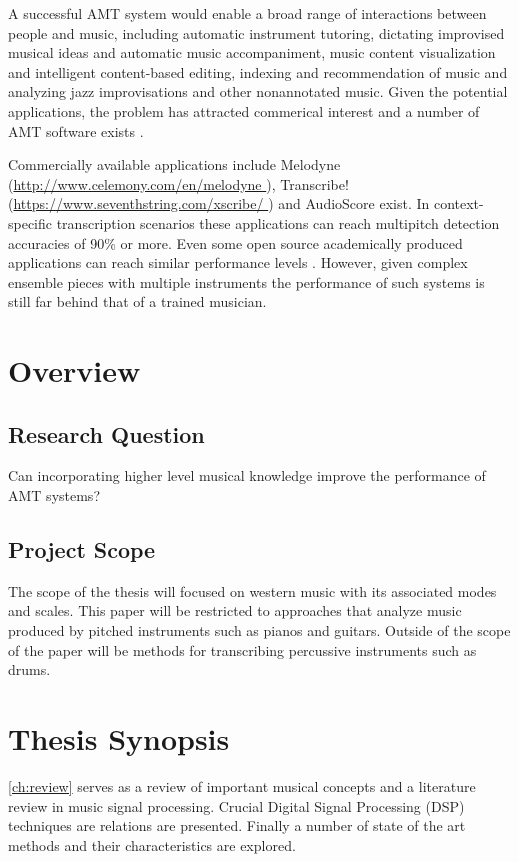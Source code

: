 A successful \ac{AMT} system would enable a broad range of interactions between
people and music, including automatic instrument tutoring, dictating improvised
musical ideas and automatic music accompaniment, music content visualization and
intelligent content-based editing, indexing and recommendation of music and
analyzing jazz improvisations and other nonannotated music. Given the potential
applications, the problem has attracted commerical interest and a number of AMT
software exists \cite{amtfc2013:Benetos}.

Commercially available applications include Melodyne (\url{http://www.celemony.com/en/melodyne }), Transcribe!(\url{https://www.seventhstring.com/xscribe/ })  and AudioScore exist.
In context-specific transcription scenarios these applications can reach multipitch detection accuracies of 90\% or more. Even some open source
academically produced applications can reach similar performance levels \cite{context-dependent2016:Cogliati}.
However, given complex ensemble pieces with multiple instruments the performance of such systems
is still far behind that of a trained musician.

\section{Overview}

\subsection{Research Question}

Can incorporating higher level musical knowledge
improve the performance of \ac{AMT} systems?

\subsection{Project Scope}

The scope of the thesis will focused on western music with its associated modes
and scales. This paper will be restricted to approaches that analyze music
produced by pitched instruments such as pianos and guitars. Outside of the scope
of the paper will be methods for transcribing percussive instruments such as
drums.

\section{Thesis Synopsis}

\autoref{ch:review} serves as a review of important musical concepts and a
literature review in music signal processing. Crucial Digital Signal Processing
(DSP) techniques are relations are presented. Finally a number of state of the
art methods and their characteristics are explored.

